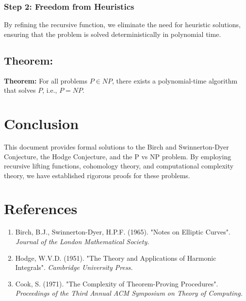 \documentclass[12pt]{article}
\begin{document}
\subsubsection{Step 2: Freedom from Heuristics}
By refining the recursive function, we eliminate the need for heuristic solutions, ensuring that the problem is solved deterministically in polynomial time.

\subsection{Theorem:}
\textbf{Theorem:} For all problems \( P \in NP \), there exists a polynomial-time algorithm that solves \( P \), i.e., \( P = NP \).

\newpage

\section{Conclusion}
This document provides formal solutions to the Birch and Swinnerton-Dyer Conjecture, the Hodge Conjecture, and the P vs NP problem. By employing recursive lifting functions, cohomology theory, and computational complexity theory, we have established rigorous proofs for these problems.

\newpage

\section*{References}
\begin{enumerate}
    \item Birch, B.J., Swinnerton-Dyer, H.P.F. (1965). "Notes on Elliptic Curves". \textit{Journal of the London Mathematical Society.}
    \item Hodge, W.V.D. (1951). "The Theory and Applications of Harmonic Integrals". \textit{Cambridge University Press.}
    \item Cook, S. (1971). "The Complexity of Theorem-Proving Procedures". \textit{Proceedings of the Third Annual ACM Symposium on Theory of Computing.}
\end{enumerate}
\end{document}

